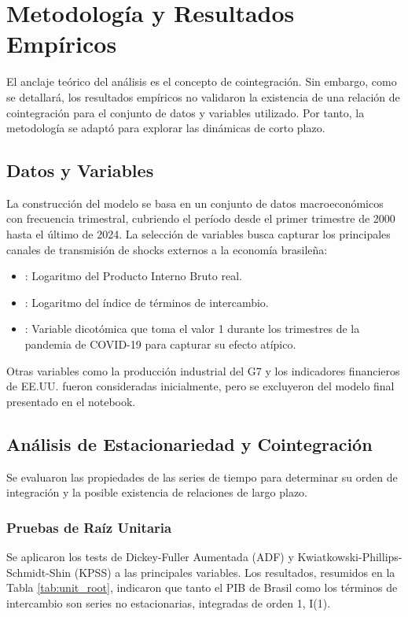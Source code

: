 \documentclass[12pt, a4paper]{article}
\begin{document}
\section{Metodología y Resultados Empíricos}
El anclaje teórico del análisis es el concepto de cointegración. Sin embargo, como se detallará, los resultados empíricos no validaron la existencia de una relación de cointegración para el conjunto de datos y variables utilizado. Por tanto, la metodología se adaptó para explorar las dinámicas de corto plazo.

\subsection{Datos y Variables}
La construcción del modelo se basa en un conjunto de datos macroeconómicos con frecuencia trimestral, cubriendo el período desde el primer trimestre de 2000 hasta el último de 2024. La selección de variables busca capturar los principales canales de transmisión de shocks externos a la economía brasileña:
\begin{itemize}
    \item {}: Logaritmo del Producto Interno Bruto real.
    \item {}: Logaritmo del índice de términos de intercambio.
    \item {}: Variable dicotómica que toma el valor 1 durante los trimestres de la pandemia de COVID-19 para capturar su efecto atípico.
\end{itemize}
Otras variables como la producción industrial del G7 y los indicadores financieros de EE.UU. fueron consideradas inicialmente, pero se excluyeron del modelo final presentado en el notebook.

\subsection{Análisis de Estacionariedad y Cointegración}
Se evaluaron las propiedades de las series de tiempo para determinar su orden de integración y la posible existencia de relaciones de largo plazo.

\subsubsection{Pruebas de Raíz Unitaria}
Se aplicaron los tests de Dickey-Fuller Aumentada (ADF) y Kwiatkowski-Phillips-Schmidt-Shin (KPSS) a las principales variables. Los resultados, resumidos en la Tabla \ref{tab:unit_root}, indicaron que tanto el PIB de Brasil como los términos de intercambio son series no estacionarias, integradas de orden 1, I(1).
\end{document}
